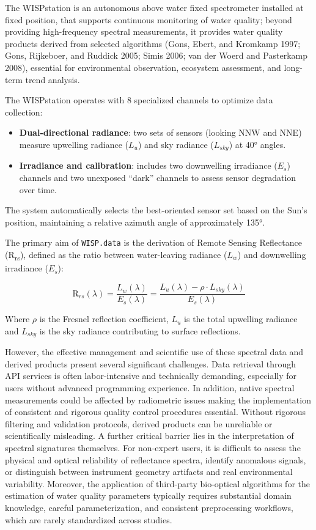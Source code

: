 \documentclass[
]{article}
\providecommand{\tightlist}{%
  \setlength{\itemsep}{0pt}\setlength{\parskip}{0pt}}
\begin{document}
The WISPstation is an autonomous above water fixed spectrometer
installed at fixed position, that supports continuous monitoring of
water quality; beyond providing high-frequency spectral measurements, it
provides water quality products derived from selected algorithms (Gons,
Ebert, and Kromkamp 1997; Gons, Rijkeboer, and Ruddick 2005; Simis 2006;
van der Woerd and Pasterkamp 2008), essential for environmental
observation, ecosystem assessment, and long-term trend analysis.

The WISPstation operates with 8 specialized channels to optimize data
collection:

\begin{itemize}
\tightlist
\item
  \textbf{Dual-directional radiance}: two sets of sensors (looking NNW
  and NNE) measure upwelling radiance (\(L_u\)) and sky radiance
  (\(L_{sky}\)) at 40° angles.
\item
  \textbf{Irradiance and calibration}: includes two downwelling
  irradiance (\(E_s\)) channels and two unexposed ``dark'' channels to
  assess sensor degradation over time.
\end{itemize}

The system automatically selects the best-oriented sensor set based on
the Sun's position, maintaining a relative azimuth angle of
approximately 135°.

The primary aim of \texttt{WISP.data} is the derivation of Remote
Sensing Reflectance (R\textsubscript{rs}), defined as the ratio between
water-leaving radiance (\(L_w\)) and downwelling irradiance (\(E_s\)):

\[\text{R}_{rs}(\lambda) = \frac{L_w(\lambda)}{E_s(\lambda)} = \frac{L_u(\lambda) - \rho \cdot L_{sky}(\lambda)}{E_s(\lambda)}\]

Where \(\rho\) is the Fresnel reflection coefficient, \(L_u\) is the
total upwelling radiance and \(L_{sky}\) is the sky radiance
contributing to surface reflections.

However, the effective management and scientific use of these spectral
data and derived products present several significant challenges. Data
retrieval through API services is often labor-intensive and technically
demanding, especially for users without advanced programming experience.
In addition, native spectral measurements could be affected by
radiometric issues making the implementation of consistent and rigorous
quality control procedures essential. Without rigorous filtering and
validation protocols, derived products can be unreliable or
scientifically misleading. A further critical barrier lies in the
interpretation of spectral signatures themselves. For non-expert users,
it is difficult to assess the physical and optical reliability of
reflectance spectra, identify anomalous signals, or distinguish between
instrument geometry artifacts and real environmental variability.
Moreover, the application of third-party bio-optical algorithms for the
estimation of water quality parameters typically requires substantial
domain knowledge, careful parameterization, and consistent preprocessing
workflows, which are rarely standardized across studies.
\end{document}
